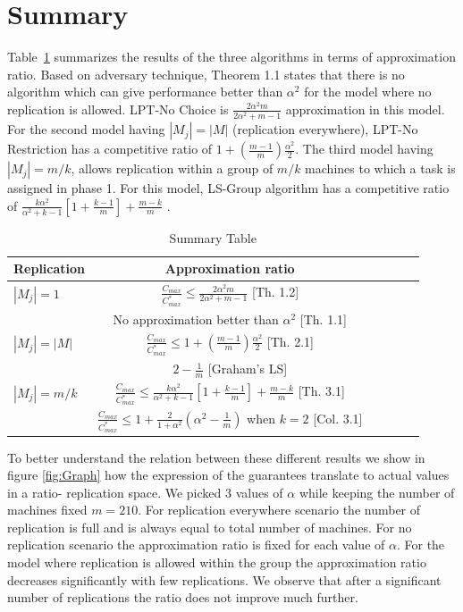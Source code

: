 \documentclass[10pt, conference, compsocconf]{IEEEtran}
\begin{document}
\section{Summary}
 Table~\ref{tab:template} summarizes the results of the three algorithms in terms of approximation ratio. Based on
adversary technique, Theorem 1.1 states that there is no algorithm which can give performance better than $\alpha^2$ for the model where no replication is allowed.  LPT-No Choice is $\frac{2\alpha^{2}m}{2\alpha^{2}+ m-1}$ approximation  in this model. For the second model having $|M_j| = |M|$ (replication everywhere), LPT-No Restriction has a competitive ratio of $1 + (\frac{m-1}{m})\frac{\alpha^{2}}{2}$.  The third model having $|M_j| = m/k$, allows replication within a group of $m/k$ machines to which a task is assigned in phase 1. For this model, LS-Group algorithm has a competitive ratio of $\frac{k\alpha^{2}}{\alpha^{2}+k-1}\left[1+ {\frac{k-1}{m}} \right]+ {\frac{m-k}{m}}$ .



\begin{table}[ht]
\centering
\begin{tabular}{|l|c|c|c|c|c|}
\hline
Replication & Approximation ratio  \\
\hline
$|M_j|=1$ & $\frac{C_{max}}{C_{max}^{*}}\leq \frac{2\alpha^{2}m}{2\alpha^{2}+ m-1}$ [Th. 1.2]  \\
 & No approximation better than $\alpha^2$ [Th. 1.1]   \\

\hline
$|M_j|=|M|$ & $\frac{C_{max}}{C_{max}^{*}} \leq 1 + (\frac{m-1}{m})\frac{\alpha^{2}}{2}$ [Th. 2.1]  \\
 & $2-\frac{1}{m}$ [Graham's LS]   \\
 \hline
 
 $|M_j|= m/k $ & $\frac{C_{max}}{C_{max}^{*}} \leq \frac{k\alpha^{2}}{\alpha^{2}+k-1}\left[1+ {\frac{k-1}{m}} \right]+ {\frac{m-k}{m}}$ [Th. 3.1]  \\
  & $\frac{C_{max}}{C_{max}^{*}} \leq  1+ \frac{2}{1+\alpha^{2}} \left(\alpha^2-\frac{1}{m}\right)$ when $k=2$ [Col. 3.1]   \\
  
  \hline
 \end{tabular}
\caption{Summary Table}
\label{tab:template}
\end{table}


To better understand the relation between these different results we show in figure \ref{fig:Graph} how the expression of the guarantees translate to actual values in a ratio- replication space.  We picked 3 values of $\alpha$ while keeping the number of machines fixed $m=210$. For replication everywhere scenario the number of replication is full and is always equal to total number of machines.  For no replication scenario the approximation ratio is fixed for each value of $\alpha$.  For the model where replication is allowed within the group the approximation ratio decreases significantly with few replications. We observe that after a significant number of replications the ratio does not improve much further. 
\end{document}
